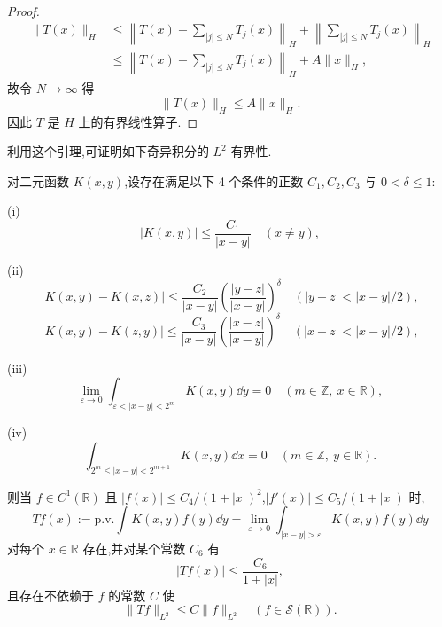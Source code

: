 \begin{proof}
\begin{align*}
\| T(x) \|_{H} & \leq \left\| T(x) - \displaystyle\sum_{|j| \leq N}T_{j}(x) \right\|_{H} + \left\| \sum_{|j| \leq N}T_{j}(x) \right\|_{H} \\
& \leq \left\| T(x) - \displaystyle\sum_{|j| \leq N}T_{j}(x) \right\|_{H} + A\| x \|_{H},
\end{align*}
故令 $N \to \infty$ 得
\begin{equation*}
\| T(x) \|_{H} \leq A\| x \|_{H}.
\end{equation*}
因此 $T$ 是 $H$ 上的有界线性算子.
\end{proof}

利用这个引理,可证明如下奇异积分的 $L^{2}$ 有界性.

\begin{theorem}\label{thm:1.10.2}
对二元函数 $K(x, y)$,设存在满足以下 4 个条件的正数 $C_{1}, C_{2}, C_{3}$ 与 $0 < \delta \leq 1$:

(i)
\begin{equation*}
|K(x, y)| \leq \frac{C_{1}}{|x - y|} \quad (x \neq y),
\end{equation*}

(ii)
\begin{equation*}
|K(x, y) - K(x, z)| \leq \frac{C_{2}}{|x - y|}\left(\frac{|y - z|}{|x - y|}\right)^{\delta} \quad (|y - z| < |x - y|/2),
\end{equation*}
\begin{equation*}
|K(x, y) - K(z, y)| \leq \frac{C_{3}}{|x - y|}\left(\frac{|x - z|}{|x - y|}\right)^{\delta} \quad (|x - z| < |x - y|/2),
\end{equation*}

(iii)
\begin{equation*}
\lim_{\varepsilon \to 0}\int_{\varepsilon < |x - y| < 2^{m}}K(x, y)\dd y = 0 \quad (m \in \mathbb{Z},\ x \in \mathbb{R}),
\end{equation*}

(iv)
\begin{equation*}
\int_{2^{m} \leq |x - y| < 2^{m+1}}K(x, y)\dd x = 0 \quad (m \in \mathbb{Z},\ y \in \mathbb{R}).
\end{equation*}

则当 $f \in C^{1}(\mathbb{R})$ 且 $|f(x)| \leq C_{4}/(1 + |x|)^{2}$,$|f'(x)| \leq C_{5}/(1 + |x|)$ 时,
\begin{equation*}
Tf(x) := \mathrm{p.v.}\int K(x, y)f(y)\dd y = \lim_{\varepsilon \to 0}\int_{|x - y| > \varepsilon}K(x, y)f(y)\dd y
\end{equation*}
对每个 $x \in \mathbb{R}$ 存在,并对某个常数 $C_{6}$ 有
\begin{equation*}
|Tf(x)| \leq \frac{C_{6}}{1 + |x|},
\end{equation*}
且存在不依赖于 $f$ 的常数 $C$ 使
\begin{equation*}
\| Tf \|_{L^{2}} \leq C\| f \|_{L^{2}} \quad (f \in \mathcal{S}(\mathbb{R})).
\end{equation*}
\end{theorem}


